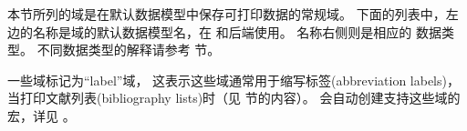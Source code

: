
本节所列的域是在默认数据模型中保存可打印数据的常规域。
下面的列表中，左边的名称是域的默认数据模型名，在 \biblatex 和后端使用。
名称右侧则是相应的 \biblatex 数据类型。
不同数据类型的解释请参考  节。


一些域标记为“label”域，
这表示这些域通常用于缩写标签(abbreviation labels)，当打印文献列表(bibliography lists)时（见 节的内容）。
\biblatex 会自动创建支持这些域的宏，详见 。

